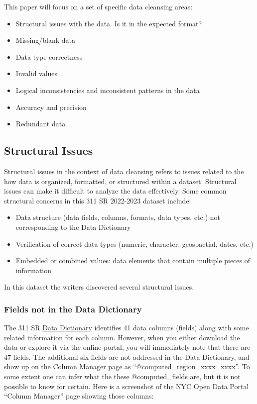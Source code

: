 \documentclass[12pt, titlepage]{article}
\begin{document}
This paper will focus on a set of specific data cleansing areas:

\begin{itemize}
	\item Structural issues with the data. Is it in the expected format?
	\item Missing/blank data
	\item Data type correctness
	\item Invalid values
	\item Logical inconsistencies and inconsistent patterns in the data
	\item Accuracy and precision
	\item Redundant data  
\end{itemize}

\subsection{Structural Issues}

Structural issues in the context of data cleansing refers to issues related to the how data is organized, formatted, or structured within a dataset. Structural issues 
can make it difficult to analyze the data effectively. Some common structural concerns in this 311 SR 2022-2023 dataset include:

\begin{itemize}
	\item Data structure (data fields, columns, formats, data types, etc.) not corresponding to the Data Dictionary
	\item Verification of correct data types (numeric, character, geospactial, dates, etc.)
	\item Embedded or combined values: data elements that contain multiple pieces of information 
\end{itemize}

In this dataset the writers discovered several structural issues.

	\subsubsection{Fields not in the Data Dictionary}
	The 311 SR \href{https://data.cityofnewyork.us/api/views/erm2-nwe9/files/b372b884-f86a-453b-ba16-1fe06ce9d212?download=true&filename=311_ServiceRequest_2010-Present_DataDictionary_Updated_2023.xlsx}{Data Dictionary} identifies 41 data columns (fields) along with some
	related information for each column. However, when you either download the data or explore it via the online portal,
	you will immediately note that there are 47 fields. The additional six fields are not addressed in the Data Dictionary, and show up on the Column Manager
	page as ``@computed\_region\_xxxx\_xxxx''. To some extent one can infer what the these @computed\_fields are, but it is not possible to know
	for certain. Here is a screenshot of the NYC Open Data Portal ``Column Manager'' page showing those columns:
\end{document}
